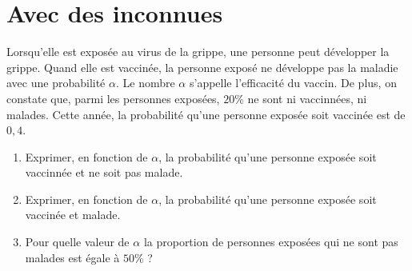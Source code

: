 \documentclass[11pt]{article}
\begin{document}
\section{Avec des inconnues}
\begin{app}
Lorsqu'elle est exposée au virus de la grippe, une
personne peut développer la grippe. Quand elle est vaccinée, la personne exposé
ne développe pas la maladie avec une probabilité $\alpha$. Le nombre $\alpha$
s'appelle l'efficacité du vaccin. De plus, on constate que, parmi les personnes
exposées, $20$\% ne sont ni vaccinnées, ni malades. Cette année, la probabilité
qu'une personne exposée soit vaccinée est de $0,4$.
\begin{enumerate}
  \item Exprimer, en fonction de $\alpha$, la probabilité qu'une personne
    exposée soit vaccinnée et ne soit pas malade.
  \item Exprimer, en fonction de $\alpha$, la probabilité qu'une personne
    exposée soit vaccinée et malade.
  \item Pour quelle valeur de $\alpha$ la proportion de personnes exposées qui
    ne sont pas malades est égale à $50$\% ?
\end{enumerate}
\end{app}
\end{document}
